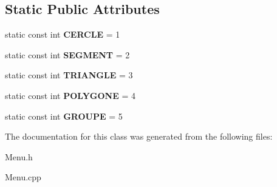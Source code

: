 \subsection*{Static Public Attributes}
\begin{DoxyCompactItemize}
\item 
\mbox{\label{class_menu_a7cf04658c698065f6dbb72a0b8fd4bcd}} 
static const int {\bfseries C\+E\+R\+C\+LE} = 1
\item 
\mbox{\label{class_menu_a5ebb4919ea7020fd5749b198cb3d062e}} 
static const int {\bfseries S\+E\+G\+M\+E\+NT} = 2
\item 
\mbox{\label{class_menu_aa625b786c8eb1a7884a47ffdef56e176}} 
static const int {\bfseries T\+R\+I\+A\+N\+G\+LE} = 3
\item 
\mbox{\label{class_menu_a75608d9547f52b339114aa8e692a67f0}} 
static const int {\bfseries P\+O\+L\+Y\+G\+O\+NE} = 4
\item 
\mbox{\label{class_menu_a944b9477a7f3b7afc3119c938b2365da}} 
static const int {\bfseries G\+R\+O\+U\+PE} = 5
\end{DoxyCompactItemize}


The documentation for this class was generated from the following files\+:\begin{DoxyCompactItemize}
\item 
Menu.\+h\item 
Menu.\+cpp\end{DoxyCompactItemize}
